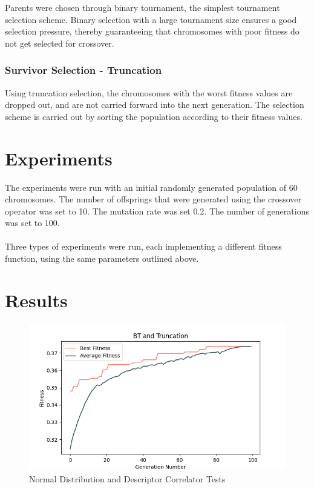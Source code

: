 \documentclass[conference]{IEEEtran}
\begin{document}
Parents were chosen through binary tournament, the simplest tournament selection scheme. Binary selection with a large tournament size ensures a good selection pressure, thereby guaranteeing that chromosomes with poor fitness do not get selected for crossover.

\subsubsection{Survivor Selection - Truncation}
Using truncation selection, the chromosomes with the worst fitness values are dropped out, and are not carried forward into the next generation. The selection scheme is carried out by sorting the population according to their fitness values.

\section{Experiments}
The experiments were run with an initial randomly generated population of 60 chromosomes. The number of offsprings that were generated using the crossover operator was set to 10. The mutation rate was set 0.2. The number of generations was set to 100. \\
\\
Three types of experiments were run, each implementing a different fitness function, using the same parameters outlined above. 

\section{Results}
\begin{figure}[htbp]
\centerline{\includegraphics[scale = 0.5]{fitness1-100.png}}
\caption{Normal Distribution and Descriptor Correlator Tests}
\label{fig}
\end{figure}
\end{document}
